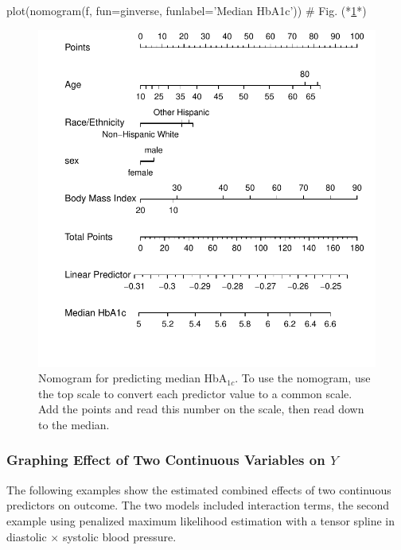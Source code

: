 \begin{Schunk}
\begin{Sinput}
plot(nomogram(f, fun=ginverse, funlabel='Median HbA1c'))  # Fig. (*\ref{fig:descript-rmsc}*)
\end{Sinput}
\begin{figure}[htbp]

\centerline{\includegraphics{descript-rmsc-1} }

\caption[Nomogram for predicting median HbA$_{1c}$]{Nomogram for predicting median HbA$_{1c}$.  To use the nomogram, use the top  scale to convert each predictor value to a common scale.  Add the points and read this number on the  scale, then read down to the median.}\label{fig:descript-rmsc}
\end{figure}
\end{Schunk}

\subsubsection{Graphing Effect of Two Continuous Variables on $Y$}
The following examples show the estimated combined effects of two
continuous predictors on outcome.  The two models included interaction
terms, the second example using penalized maximum likelihood
estimation with a tensor spline in diastolic $\times$ systolic blood pressure.

